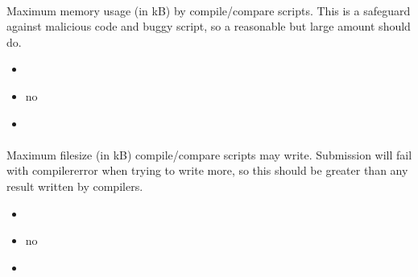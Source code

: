 \documentclass[a4paper,10pt,english,openany]{sphinxmanual}
\begin{document}
\paragraph{}
\label{\detokenize{configuration-reference:script-memory-limit}}
\sphinxAtStartPar
Maximum memory usage (in kB) by compile/compare scripts. This is a safeguard against malicious code and buggy script, so a reasonable but large amount should do.
\begin{itemize}
\item {} 
\sphinxAtStartPar
{} 

\item {} 
\sphinxAtStartPar
{} no

\item {} 
\sphinxAtStartPar
{} 

\end{itemize}


\paragraph{}
\label{\detokenize{configuration-reference:script-filesize-limit}}
\sphinxAtStartPar
Maximum filesize (in kB) compile/compare scripts may write. Submission will fail with compiler\sphinxhyphen{}error when trying to write more, so this should be greater than any  result written by compilers.
\begin{itemize}
\item {} 
\sphinxAtStartPar
{} 

\item {} 
\sphinxAtStartPar
{} no

\item {} 
\sphinxAtStartPar
{} 

\end{itemize}
\end{document}
